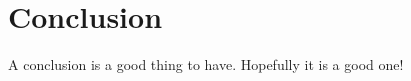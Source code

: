 \chapter{Conclusion}\label{ch:7483}

A conclusion is a good thing to have. Hopefully it is a good one!
